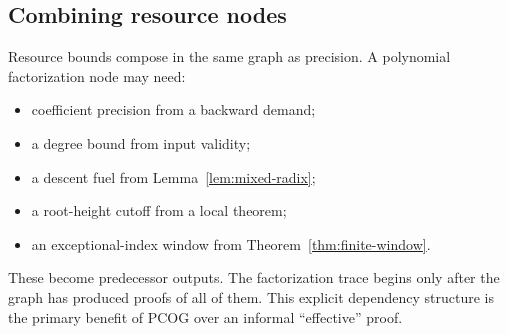 \subsection{Combining resource nodes}

Resource bounds compose in the same graph as precision.  A polynomial
factorization node may need:
\begin{itemize}
\item coefficient precision from a backward demand;
\item a degree bound from input validity;
\item a descent fuel from Lemma~\ref{lem:mixed-radix};
\item a root-height cutoff from a local theorem;
\item an exceptional-index window from Theorem~\ref{thm:finite-window}.
\end{itemize}
These become predecessor outputs.  The factorization trace begins only after
the graph has produced proofs of all of them.  This explicit dependency
structure is the primary benefit of PCOG over an informal ``effective'' proof.
